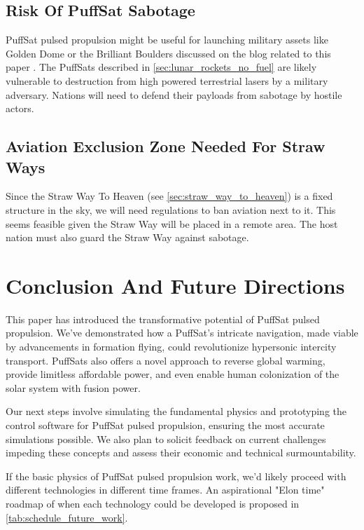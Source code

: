 \documentclass{article}
\begin{document}
\subsection{Risk Of PuffSat Sabotage}
PuffSat pulsed propulsion might be useful for launching military assets like Golden Dome \cite{lockheed_martin_golden_dome} or the Brilliant Boulders \cite{brilliant_boulders} discussed on the blog related to this paper \cite{aim2024}.   The PuffSats described in \autoref{sec:lunar_rockets_no_fuel} are likely vulnerable to destruction from high powered terrestrial lasers by a military adversary.  Nations will need to defend their payloads from sabotage by hostile actors.

\subsection{Aviation Exclusion Zone Needed For Straw Ways}
Since the Straw Way To Heaven (see \autoref{sec:straw_way_to_heaven}) is a fixed structure in the sky, we will need regulations to ban aviation next to it.   This seems feasible given the Straw Way will be placed in a remote area.   The host nation must also guard the Straw Way against sabotage.


\section{Conclusion And Future Directions}
This paper has introduced the transformative potential of PuffSat pulsed propulsion. We've demonstrated how a PuffSat's intricate navigation, made viable by advancements in formation flying, could revolutionize hypersonic intercity transport.  PuffSats also offers a novel approach to reverse global warming, provide limitless affordable power, and even enable human colonization of the solar system with fusion power. 

Our next steps involve simulating the fundamental physics and prototyping the control software for PuffSat pulsed propulsion, ensuring the most accurate simulations possible. We also plan to solicit feedback on current challenges impeding these concepts and assess their economic and technical surmountability.

If the basic physics of PuffSat pulsed propulsion work, we'd likely proceed with different technologies in different time frames.  An aspirational "Elon time" \cite{wiktionary_elon_time} roadmap of when each technology could be  developed is proposed in \autoref{tab:schedule_future_work}.
\end{document}

